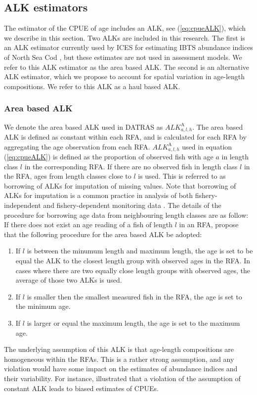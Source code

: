 \documentclass[a4paper 12pt]{article}
\numberwithin{equation}{section}
\begin{document}
\subsection{ALK estimators}
\label{sec:alkmethods}
The estimator of the CPUE of age includes an ALK, see (\ref{eq:cpueALK}), which we describe in this section. Two ALKs are included in this research. The first is an ALK estimator currently used by ICES for estimating IBTS abundance indices of North Sea Cod \cite{ICES2013}, but these estimates are not used in assessment models. We refer to this ALK estimator as the area based ALK. The second is an alternative ALK estimator, which we propose to account for spatial variation in age-length compositions. We refer to this ALK as a haul based ALK.

\subsubsection{Area based ALK}
\label{sec:datrasalkestimator}
We denote the area based ALK used in DATRAS as $ALK^{\text{A}}_{a,l,h}$. The area based ALK is defined as constant within each RFA, and is calculated for each RFA by aggregating the age observation from each RFA. $ALK^{\text{A}}_{a,l,h}$ used in equation (\ref{eq:cpueALK}) is defined as the proportion of observed fish with age $a$ in length class $l$ in the corresponding RFA. If there are no observed fish in length class $l$ in the RFA, ages from length classes close to $l$ is used. This is referred to as borrowing of ALKs for imputation of missing values. Note that borrowing of ALKs for imputation is a common practice in analysis of both fishery-independent and fishery-dependent monitoring data \citep[see for example,][]{aanes2015efficient,catchpole2017challenges}. The details of the procedure for borrowing age data from neighbouring length classes are as follow: If there does not exist an age reading of a fish of length $l$ in an RFA,  \citet{ICES2013} propose that the following procedure  for the area based ALK be adopted:
\begin{enumerate}
\item If $l$ is between the minumum length and maximum length, the age is set to be equal the ALK to the closest length group with observed ages in the RFA. In cases where there are two equally close length groups with observed ages, the average of those two ALKs is used. 
\item If $l$ is smaller then the smallest measured fish in the RFA, the age is set to the minimum age.
\item If $l$ is larger or equal the maximum length, the age is set to the maximum age.
\end{enumerate}
The underlying assumption of this ALK  is that age-length compositions are homogeneous within the RFAs. This is a rather strong assumption, and any violation would have some impact on the estimates of abundance indices and their variability. For instance,  \citet{aanes2015efficient} illustrated that a violation of the assumption of constant ALK leads to biased estimates of CPUEs. 
\end{document}
